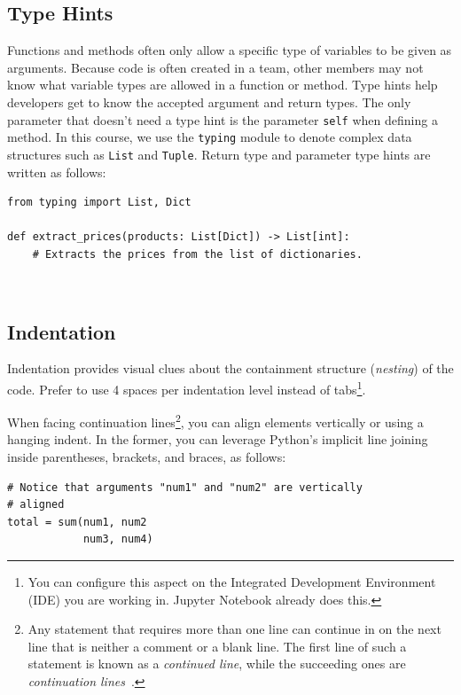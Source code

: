 \documentclass{tufte-handout}
\begin{document}
\subsection{Type Hints}
Functions and methods often only allow a specific type of variables to be given as arguments.
Because code is often created in a team, other members may not know what variable types are allowed in a function or method.
Type hints help developers get to know the accepted argument and return types.
The only parameter that doesn't need a type hint is the parameter \texttt{self} when defining a method.
In this course, we use the \texttt{typing} module to denote complex data structures such as \texttt{List} and \texttt{Tuple}.
Return type and parameter type hints are written as follows:

\begin{mdframed}
\begin{verbatim}
from typing import List, Dict

def extract_prices(products: List[Dict]) -> List[int]:
    # Extracts the prices from the list of dictionaries.
\end{verbatim}
\end{mdframed}

\


\subsection{Indentation}

Indentation provides visual clues about the containment structure (\emph{nesting\/}) of the code.
Prefer to use 4 spaces per indentation level instead of tabs\footnote{You can configure this aspect on the Integrated Development Environment (IDE) you are working in. Jupyter Notebook already does this.}.

When facing continuation lines\footnote{Any statement that requires more than one line can continue in on the next line that is neither a comment or a blank line. The first line of such a statement is known as a \emph{continued line}, while the succeeding ones are \emph{continuation lines}~\cite{ibm2022continuation}.}, you can align elements vertically or using a hanging indent.
In the former, you can leverage Python's implicit line joining inside parentheses, brackets, and braces, as follows:


\begin{mdframed}
\begin{verbatim}
# Notice that arguments "num1" and "num2" are vertically 
# aligned
total = sum(num1, num2
            num3, num4)
\end{verbatim}
\end{mdframed}
\end{document}
